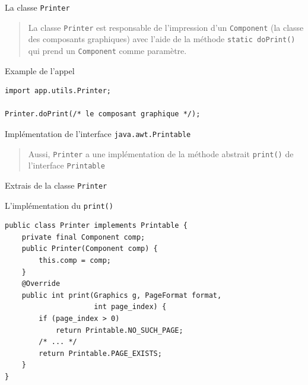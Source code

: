 \documentclass[captions=tableheading]{beamer}
\begin{document}
\begin{frame}[fragile,label={sec:orga0eb7c7}]{La classe \texttt{Printer}}
 \begin{quote}
La classe \texttt{Printer} est responsable de l'impression d'un \texttt{Component} (la classe des composants graphiques) avec l'aide de la méthode \texttt{static doPrint()} qui prend un \texttt{Component} comme paramètre.
\end{quote}
\pause

\begin{block}{Example de l'appel}
\begin{verbatim}
import app.utils.Printer;

Printer.doPrint(/* le composant graphique */);
\end{verbatim}
\pause
\end{block}
\begin{block}{Implémentation de l'interface \texttt{java.awt.Printable}}
\begin{quote}
Aussi, \texttt{Printer} a une implémentation de la méthode abstrait \texttt{print()} de l'interface \texttt{Printable}
\end{quote}
\end{block}
\end{frame}

\begin{frame}[fragile,label={sec:org815c2a9}]{Extrais de la classe \texttt{Printer}}
 \begin{block}{L'implémentation du \texttt{print()}}
\begin{verbatim}
public class Printer implements Printable {
    private final Component comp;
    public Printer(Component comp) {
        this.comp = comp;
    }
    @Override
    public int print(Graphics g, PageFormat format,
                     int page_index) {
        if (page_index > 0)
            return Printable.NO_SUCH_PAGE;
        /* ... */
        return Printable.PAGE_EXISTS;
    }
}
\end{verbatim}
\end{block}
\end{frame}
\end{document}
